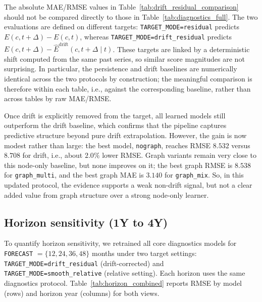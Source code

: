 \documentclass[pdflatex,sn-basic]{sn-jnl}
\begin{document}
The absolute MAE/RMSE values in Table~\ref{tab:drift_residual_comparison} should not be compared directly to those in Table~\ref{tab:diagnostics_full}.
The two evaluations are defined on different targets: \texttt{TARGET\_MODE=residual} predicts
\(E(c,t+\Delta)-E(c,t)\), whereas \texttt{TARGET\_MODE=drift\_residual} predicts
\(E(c,t+\Delta)-\widehat{E}^{\text{drift}}(c,t+\Delta \mid t)\).
These targets are linked by a deterministic shift computed from the same past series, so similar score magnitudes are not surprising.
In particular, the persistence and drift baselines are numerically identical across the two protocols by construction; the meaningful comparison is therefore within each table, i.e., against the corresponding baseline, rather than across tables by raw MAE/RMSE.

Once drift is explicitly removed from the target, all learned models still outperform the drift baseline,
which confirms that the pipeline captures predictive structure beyond pure drift extrapolation.
However, the gain is now modest rather than large: the best model, \texttt{nograph}, reaches
RMSE \(8.532\) versus \(8.708\) for drift, i.e., about \(2.0\%\) lower RMSE.
Graph variants remain very close to this node-only baseline, but none improves on it; the best graph
RMSE is \(8.538\) for \texttt{graph\_multi}, and the best graph MAE is \(3.140\) for \texttt{graph\_mix}.
So, in this updated protocol, the evidence supports a weak non-drift signal, but not a clear added value
from graph structure over a strong node-only learner.

\subsection{Horizon sensitivity (1Y to 4Y)}
To quantify horizon sensitivity, we retrained all core diagnostics models for \texttt{FORECAST} \(=\{12,24,36,48\}\) months under two target settings:
\texttt{TARGET\_MODE=drift\_residual} (drift-corrected) and
\texttt{TARGET\_MODE=smooth\_relative} (relative setting).
Each horizon uses the same diagnostics protocol. Table~\ref{tab:horizon_combined}
reports RMSE by model (rows) and horizon year (columns) for both views.
\end{document}
